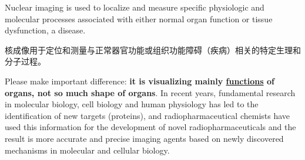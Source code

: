 \documentclass[dvipsnames, svgnames,a4paper,11pt]{article}
\begin{document}
Nuclear imaging is used to localize and measure specific physiologic and molecular processes associated with either normal organ function or tissue dysfunction, a disease.

核成像用于定位和测量与正常器官功能或组织功能障碍（疾病）相关的特定生理和分子过程。

Please make important difference: \textbf{it is visualizing mainly \underline{functions} of organs, not so much shape of organs}. In recent years, fundamental research in molecular biology, cell biology and human physiology has led to the identification of new targets (proteins), and radiopharmaceutical chemists have used this information for the development of novel radiopharmaceuticals and the result is more accurate and precise imaging agents based on newly discovered mechanisms in molecular and cellular biology.
\end{document}
